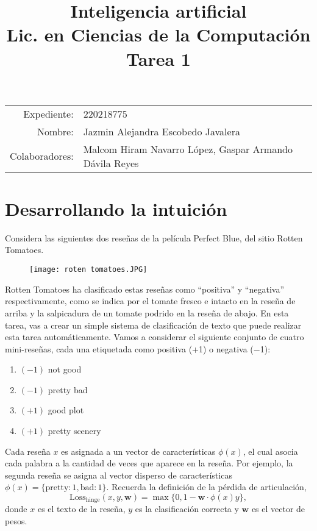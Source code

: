 \documentclass[11pt,letterpaper]{article}
\title{%
  \bfseries
  Inteligencia artificial\\%
  Lic. en Ciencias de la Computación\\%
  Tarea 1
}
\date{}
\begin{document}
\maketitle

\vspace{-2.5cm}
\begin{center}
  \begin{tabular}{rl}
    Expediente: & 220218775\\
    Nombre: &  Jazmin Alejandra Escobedo Javalera\\
    Colaboradores: & Malcom Hiram Navarro López,
Gaspar Armando Dávila Reyes\end{tabular}
\end{center}


\section*{Desarrollando la intuición}


    Considera las siguientes dos reseñas de la película Perfect Blue, del sitio Rotten Tomatoes.
    \begin{figure}[h]
    \centering
    \texttt{[image: roten tomatoes.JPG]}
    \end{figure}
      Rotten Tomatoes ha clasificado estas reseñas como “positiva” y “negativa” respectivamente, como
    se indica por el tomate fresco e intacto en la reseña de arriba y la salpicadura de un tomate podrido
    en la reseña de abajo. En esta tarea, vas a crear un simple sistema de clasificación de texto que
    puede realizar esta tarea automáticamente. Vamos a considerar el siguiente conjunto de cuatro
mini-reseñas, cada una etiquetada como positiva (+1) o negativa (−1):
\begin{enumerate}
    \item $(-1)$ not good
    \item $(-1)$ pretty bad
    \item $(+1)$ good plot
    \item $(+1)$ pretty scenery
\end{enumerate}


Cada reseña $x$ es asignada a un vector de características $\phi(x)$, el cual asocia cada palabra a la cantidad de veces que aparece en la reseña. Por ejemplo, la segunda reseña se asigna al vector disperso de características $\phi(x) = \{ \text{pretty} : 1, \text{bad} : 1 \}$. Recuerda la definición de la pérdida de articulación,
\[
\text{Loss}_{\text{hinge}}(x, y, \mathbf{w}) = \max \{0, 1 - \mathbf{w} \cdot \phi(x) y\},
\]
donde $x$ es el texto de la reseña, $y$ es la clasificación correcta y $\mathbf{w}$ es el vector de pesos.
\end{document}

